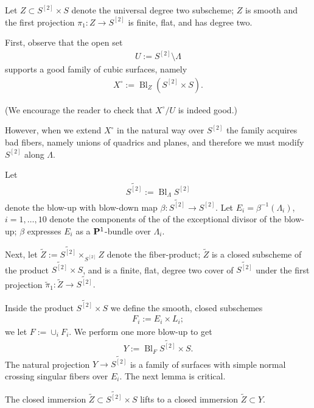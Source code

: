 \documentclass[12pt,reqno]{amsart}
\DeclareMathOperator{\Bl}{Bl}
\renewcommand{\to}{{\longrightarrow}}
\numberwithin{equation}{section}
\begin{document}
Let $Z \subset S^{[2]} \times S$ denote the universal degree two
subscheme; $Z$ is smooth and the first projection
$\pi_1 : Z \to S^{[2]}$ is finite, flat, and has degree two.



First, observe that the open set
\begin{align}
  \label{eq:UB3}
  U := S^{[2]} \setminus \Lambda
\end{align}
supports a good family of cubic surfaces, namely
\begin{align}
  \label{eq:XUB3}
  X^{\circ} := \Bl_{Z}(S^{[2]} \times S).
\end{align}

(We encourage the reader to check that $X^{\circ}/U$ is indeed good.)

However, when we extend $X^{\circ}$ in the natural way over $S^{[2]}$
the family acquires bad fibers, namely unions of quadrics and planes,
and therefore we must modify $S^{[2]}$ along $\Lambda$.

Let
\begin{align}
  \label{eq:S2tilde}
  \widetilde{S^{[2]}} := \Bl_{\Lambda}S^{[2]}
\end{align}
denote the blow-up with blow-down map
$\beta: \widetilde{S^{[2]}} \to S^{[2]}$.  Let
$E_{i} = \beta^{-1}(\Lambda_{i})$, $i=1, \dots, 10$ denote the
components of the of the exceptional divisor of the blow-up; $\beta$
expresses $E_{i}$ as a $\P^{1}$-bundle over $\Lambda_{i}$.

Next, let $\widetilde{Z} := \widetilde{S^{[2]}} \times_{S^{[2]}} Z$
denote the fiber-product; $\widetilde{Z}$ is a closed subscheme of the
product $\widetilde{S^{[2]}} \times S$, and is a finite, flat, degree
two cover of $\widetilde{S^{[2]}}$ under the first projection
$\tilde{\pi}_{1} : \widetilde{Z} \to \widetilde{S^{[2]}}.$

Inside the product $\widetilde{S^{[2]}} \times S$ we define the
smooth, closed subschemes
\begin{align}
  \label{eq:Fi}
  F_{i} := E_{i} \times L_{i};
\end{align}
we let $F := \cup_{i}F_{i}$.  We perform one more blow-up to get 
\begin{align}
  \label{eq:Xtilde}
  Y := \Bl_{F}\widetilde{S^{[2]}} \times S.
\end{align}
The natural projection $ Y \to \widetilde{S^{[2]}}$ is a family of
surfaces with simple normal crossing singular fibers over $E_{i}$.
The next lemma is critical.

\begin{lemma}
  The closed immersion
  $\widetilde{Z} \subset \widetilde{S^{[2]}} \times S$ lifts to a
  closed immersion $\widetilde{Z} \subset Y$.
\end{lemma}
\end{document}
